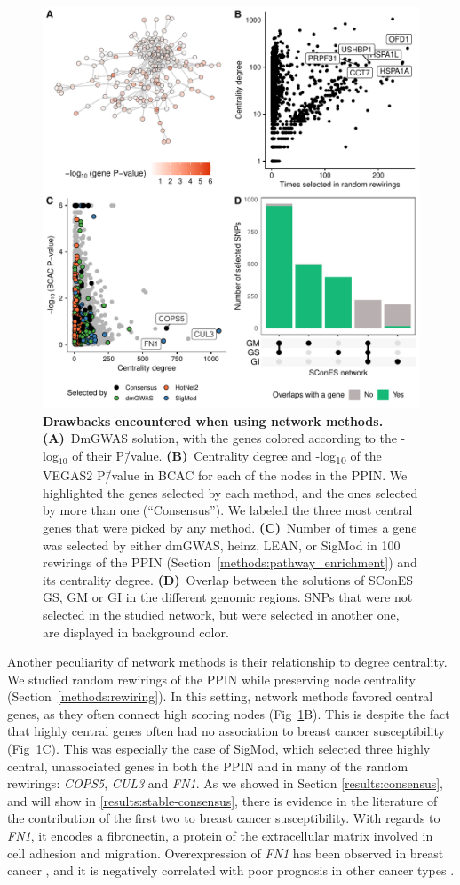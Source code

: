 \documentclass[10pt,letterpaper]{article}
\begin{document}
\begin{figure}[!ht]
  \centering
  \includegraphics[width=.8\linewidth]{./figures/figure_2.pdf}
  \caption{{\bf Drawbacks encountered when using network methods.} \textbf{(A)}~DmGWAS solution, with the genes colored according to the -log$_{10}$ of their P\=/value. \textbf{(B)}~Centrality degree and -log\textsubscript{10} of the VEGAS2 P\=/value in BCAC for each of the nodes in the PPIN. We highlighted the genes selected by each method, and the ones selected by more than one (``Consensus''). We labeled the three most central genes that were picked by any method. \textbf{(C)}~Number of times a gene was selected by either dmGWAS, heinz, LEAN, or SigMod in 100 rewirings of the PPIN (Section~\ref{methods:pathway_enrichment}) and its centrality degree. \textbf{(D)}~Overlap between the solutions of SConES GS, GM or GI in the different genomic regions. SNPs that were not selected in the studied network, but were selected in another one, are displayed in background color. }
  \label{fig:issues}
  \end{figure}

Another peculiarity of network methods is their relationship to degree centrality. We studied random rewirings of the PPIN while preserving node centrality (Section~\ref{methods:rewiring}). In this setting, network methods favored central genes, as they often connect high scoring nodes (Fig~\ref{fig:issues}B). This is despite the fact that highly central genes often had no association to breast cancer susceptibility (Fig~\ref{fig:issues}C). This was especially the case of SigMod, which selected three highly central, unassociated genes in both the PPIN and in many of the random rewirings: \emph{COPS5}, \emph{CUL3} and \emph{FN1}. As we showed in Section \ref{results:consensus}, and will show in \ref{results:stable-consensus}, there is evidence in the literature of the contribution of the first two to breast cancer susceptibility. With regards to \emph{FN1}, it encodes a fibronectin, a protein of the extracellular matrix involved in cell adhesion and migration. Overexpression of \emph{FN1} has been observed in breast cancer \cite{Ioachim2002}, and it is negatively correlated with poor prognosis in other cancer types \cite{Yi2016,Sponziello2016}.
\end{document}
